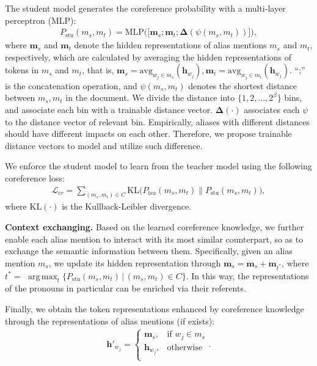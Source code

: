 \documentclass[runningheads]{llncs}
\DeclareMathOperator*{\argmax}{arg\,max}
\begin{document}
The student model generates the coreference probability with a multi-layer perceptron (MLP):
\begin{align}
	P_\text{stu}(m_s,m_t) = \mathrm{MLP}\Big(\big[\mathbf{m}_s;\mathbf{m}_t; \mathbf{\Delta} (\psi (m_s,m_t))\big]\Big),
\end{align}
where $\mathbf{m}_s$ and $\mathbf{m}_t$ denote the hidden representations of alias mentions $m_s$ and $m_t$, respectively, which are calculated by averaging the hidden representations of tokens in $m_s$ and $m_t$,
that is, $\mathbf{m}_s = \mathrm{avg}_{w_j \in m_s}(\mathbf{h}_{w_j}), \mathbf{m}_t = \mathrm{avg}_{w_j \in m_t}(\mathbf{h}_{w_j})$.
``;'' is the concatenation operation,
and $\psi (m_s,m_t)$ denotes the shortest distance between $m_s,m_t$ in the document.
We divide the distance into $\{1,2,\dots,2^\beta\}$ bins, and associate each bin with a trainable distance vector.
$\mathbf{\Delta} (\cdot)$ associates each $\psi$ to the distance vector of relevant bin. Empirically, aliases with different distances should have different impacts on each other. Therefore, we propose trainable distance vectors to model and utilize such difference.

We enforce the student model to learn from the teacher model using the following coreference loss:
\begin{align}
    \mathcal{L}_{cr} = \sum_{(m_s,m_t)\in C} \mathrm{KL} \big(P_\text{tea}(m_s,m_t) \parallel P_\text{stu} (m_s,m_t)\big),
\end{align}
where $\mathrm{KL}(\cdot)$ is the Kullback-Leibler divergence.

\textbf{Context exchanging.}
Based on the learned coreference knowledge, we further enable each alias mention to interact with its most similar counterpart, so as to exchange the semantic information between them.
Specifically, given an alias mention $m_s$, we update its hidden representation through $\mathbf{m}_s = \mathbf{m}_s + \mathbf{m}_{t^*}$,
where $t^* =$ $\argmax_t \big\{P_\text{stu} (m_s, m_t) \,|\,(m_s,m_t) \in C\big\}$. 
In this way, the representations of the pronouns in particular can be enriched via their referents.

Finally, we obtain the token representations enhanced by coreference knowledge through the representations of alias mentions (if exists): 
\begin{align}
    \mathbf{h}'_{w_j} = \left\{
	\begin{array}{ll}
		\mathbf{m}_s, 		& \text{if } w_j \in m_s \\
		\mathbf{h}_{w_j},	& \text{otherwise} \\
	\end{array}.
\right.
\end{align}
\end{document}
